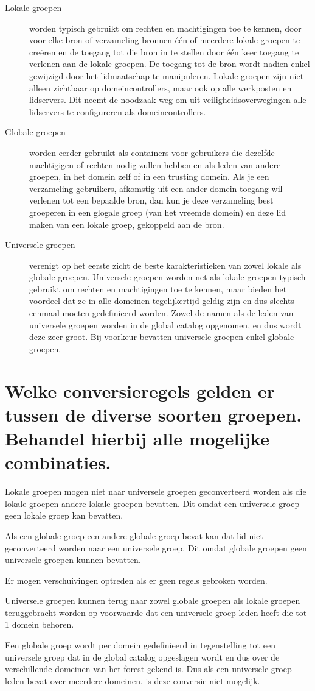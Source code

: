 \begin{description}
	\item[Lokale groepen] worden typisch gebruikt om rechten en machtigingen
		toe te kennen, door voor elke bron of verzameling bronnen één of
		meerdere lokale groepen te creëren en de toegang tot die bron in
		te stellen door één keer toegang te verlenen aan de lokale
		groepen. De toegang tot de bron wordt nadien enkel gewijzigd
		door het lidmaatschap te manipuleren. Lokale groepen zijn niet
		alleen zichtbaar op domeincontrollers, maar ook op alle
		werkposten en lidservers. Dit neemt de noodzaak weg om uit
		veiligheidsoverwegingen alle lidservers te configureren als
		domeincontrollers.
	\item[Globale groepen] worden eerder gebruikt als containers voor
		gebruikers die dezelfde machtigigen of rechten nodig zullen
		hebben en als leden van andere groepen, in het domein zelf of in
		een trusting domein. Als je een verzameling gebruikers,
		afkomstig uit een ander domein toegang wil verlenen tot een
		bepaalde bron, dan kun je deze verzameling best groeperen in een
		glogale groep (van het vreemde domein) en deze lid maken van een
		lokale groep, gekoppeld aan de bron.
	\item[Universele groepen] verenigt op het eerste zicht de beste
		karakteristieken van zowel lokale als globale groepen.
		Universele groepen worden net als lokale groepen typisch
		gebruikt om rechten en machtigingen toe te kennen, maar bieden
		het voordeel dat ze in alle domeinen tegelijkertijd geldig zijn
		en dus slechts eenmaal moeten gedefinieerd worden. Zowel de
		namen als de leden van universele groepen worden in de global
		catalog opgenomen, en dus wordt deze zeer groot. Bij voorkeur
		bevatten universele groepen enkel globale groepen.
\end{description}

\section{Welke conversieregels gelden er tussen de diverse soorten groepen.
Behandel hierbij alle mogelijke combinaties.}

Lokale groepen mogen niet naar universele groepen geconverteerd worden als die
lokale groepen andere lokale groepen bevatten. Dit omdat een universele groep
geen lokale groep kan bevatten.

Als een globale groep een andere globale groep bevat kan dat lid niet
geconverteerd worden naar een universele groep. Dit omdat globale groepen geen
universele groepen kunnen bevatten.

Er mogen verschuivingen optreden als er geen regels gebroken worden.

Universele groepen kunnen terug naar zowel globale groepen als lokale groepen
teruggebracht worden op voorwaarde dat een universele groep leden heeft die tot
1 domein behoren.

Een globale groep wordt per domein gedefinieerd in tegenstelling tot een
universele groep dat in de global catalog opgeslagen wordt en dus over de
verschillende domeinen van het forest gekend is. Dus als een universele groep
leden bevat over meerdere domeinen, is deze conversie niet mogelijk.
